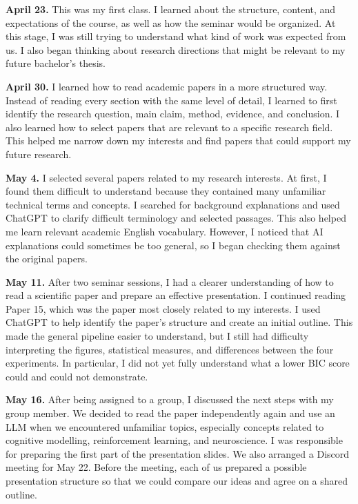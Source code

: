 \textbf{April 23.} This was my first class. I learned about the structure, content, and expectations of the course, as well as how the seminar would be organized. At this stage, I was still trying to understand what kind of work was expected from us. I also began thinking about research directions that might be relevant to my future bachelor's thesis.
 
\textbf{April 30.} I learned how to read academic papers in a more structured way. Instead of reading every section with the same level of detail, I learned to first identify the research question, main claim, method, evidence, and conclusion. I also learned how to select papers that are relevant to a specific research field. This helped me narrow down my interests and find papers that could support my future research.
 
\textbf{May 4.} I selected several papers related to my research interests. At first, I found them difficult to understand because they contained many unfamiliar technical terms and concepts. I searched for background explanations and used ChatGPT to clarify difficult terminology and selected passages. This also helped me learn relevant academic English vocabulary. However, I noticed that AI explanations could sometimes be too general, so I began checking them against the original papers.
 
\textbf{May 11.} After two seminar sessions, I had a clearer understanding of how to read a scientific paper and prepare an effective presentation. I continued reading Paper 15, which was the paper most closely related to my interests. I used ChatGPT to help identify the paper's structure and create an initial outline. This made the general pipeline easier to understand, but I still had difficulty interpreting the figures, statistical measures, and differences between the four experiments. In particular, I did not yet fully understand what a lower BIC score could and could not demonstrate.
 
\textbf{May 16.} After being assigned to a group, I discussed the next steps with my group member. We decided to read the paper independently again and use an LLM when we encountered unfamiliar topics, especially concepts related to cognitive modelling, reinforcement learning, and neuroscience. I was responsible for preparing the first part of the presentation slides. We also arranged a Discord meeting for May 22. Before the meeting, each of us prepared a possible presentation structure so that we could compare our ideas and agree on a shared outline.
 
